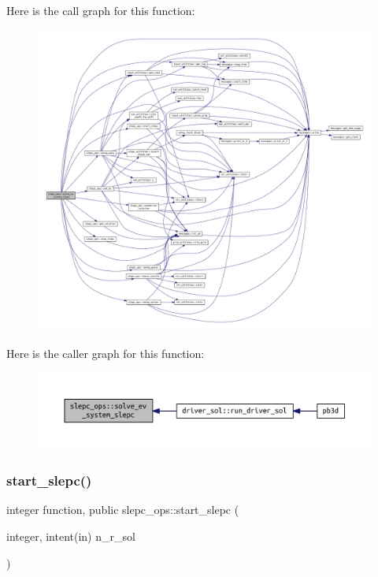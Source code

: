 Here is the call graph for this function\+:\nopagebreak
\begin{figure}[H]
\begin{center}
\leavevmode
\includegraphics[width=350pt]{namespaceslepc__ops_a79c420987056c225931b51c8d30ece1f_cgraph}
\end{center}
\end{figure}
Here is the caller graph for this function\+:\nopagebreak
\begin{figure}[H]
\begin{center}
\leavevmode
\includegraphics[width=350pt]{namespaceslepc__ops_a79c420987056c225931b51c8d30ece1f_icgraph}
\end{center}
\end{figure}
\mbox{\label{namespaceslepc__ops_a9cec5d9e8abc41d0d7ffb14352112040}} 
\subsubsection{\texorpdfstring{start\+\_\+slepc()}{start\_slepc()}}
{\footnotesize\ttfamily integer function, public slepc\+\_\+ops\+::start\+\_\+slepc (\begin{DoxyParamCaption}\item[{integer, intent(in)}]{n\+\_\+r\+\_\+sol }\end{DoxyParamCaption})}



